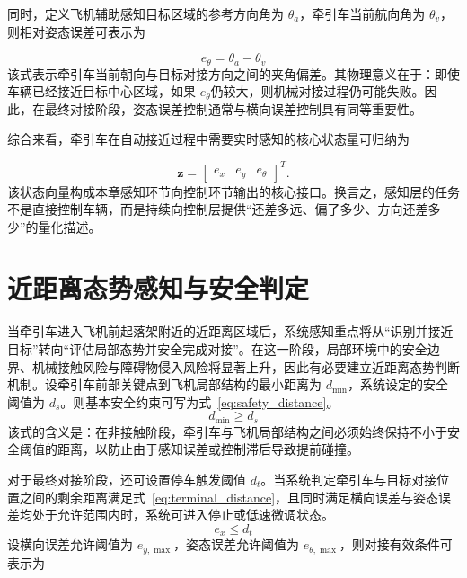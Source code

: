 同时，定义飞机辅助感知目标区域的参考方向角为
\(\theta_{a}\)，牵引车当前航向角为
\(\theta_{v}\)，则相对姿态误差可表示为

\begin{equation}
e_{\theta} = \theta_{a} - \theta_{v}
\label{eq:17}
\end{equation}
该式表示牵引车当前朝向与目标对接方向之间的夹角偏差。其物理意义在于：即使车辆已经接近目标中心区域，如果
\(e_{\theta}\)仍较大，则机械对接过程仍可能失败。因此，在最终对接阶段，姿态误差控制通常与横向误差控制具有同等重要性。

综合来看，牵引车在自动接近过程中需要实时感知的核心状态量可归纳为

\begin{equation}
\mathbf{z}=\begin{bmatrix}e_x & e_y & e_\theta\end{bmatrix}^{T}.
\label{eq:perception_output}
\end{equation}
该状态向量构成本章感知环节向控制环节输出的核心接口。换言之，感知层的任务不是直接控制车辆，而是持续向控制层提供``还差多远、偏了多少、方向还差多少''的量化描述。

\section{近距离态势感知与安全判定}

当牵引车进入飞机前起落架附近的近距离区域后，系统感知重点将从``识别并接近目标''转向``评估局部态势并安全完成对接''。在这一阶段，局部环境中的安全边界、机械接触风险与障碍物侵入风险将显著上升，因此有必要建立近距离态势判断机制。设牵引车前部关键点到飞机局部结构的最小距离为
\(d_{\min}\)，系统设定的安全阈值为
\(d_{s}\)。则基本安全约束可写为式~\ref{eq:safety_distance}。
\begin{equation}
d_{\min} \geq d_{s}
\label{eq:safety_distance}
\end{equation}
该式的含义是：在非接触阶段，牵引车与飞机局部结构之间必须始终保持不小于安全阈值的距离，以防止由于感知误差或控制滞后导致提前碰撞\cite{ref5,ref18}。

对于最终对接阶段，还可设置停车触发阈值
\(d_{t}\)。当系统判定牵引车与目标对接位置之间的剩余距离满足式~\ref{eq:terminal_distance}，且同时满足横向误差与姿态误差均处于允许范围内时，系统可进入停止或低速微调状态。
\begin{equation}
e_{x} \leq d_{t}
\label{eq:terminal_distance}
\end{equation}
设横向误差允许阈值为
\(e_{y,\max}\)，姿态误差允许阈值为
\(e_{\theta,\max}\)，则对接有效条件可表示为

